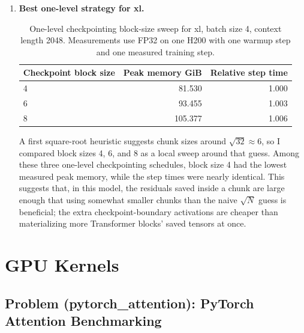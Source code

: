 \documentclass[11pt]{article}
\begin{document}
\begin{enumerate}
  \item \textbf{Best one-level strategy for xl.}
  \begin{table}[H]
    \centering
    \caption{One-level checkpointing block-size sweep for xl, batch size 4, context length 2048. Measurements use FP32 on one H200 with one warmup step and one measured training step.}
    \begin{tabular}{lrr}
      \toprule
      Checkpoint block size & Peak memory GiB & Relative step time \\
      \midrule
      4 & 81.530 & 1.000 \\
      6 & 93.455 & 1.003 \\
      8 & 105.377 & 1.006 \\
      \bottomrule
    \end{tabular}
  \end{table}
  A first square-root heuristic suggests chunk sizes around $\sqrt{32}\approx 6$, so I compared block sizes 4, 6, and 8 as a local sweep around that guess. Among these three one-level checkpointing schedules, block size 4 had the lowest measured peak memory, while the step times were nearly identical. This suggests that, in this model, the residuals saved inside a chunk are large enough that using somewhat smaller chunks than the naive $\sqrt{N}$ guess is beneficial; the extra checkpoint-boundary activations are cheaper than materializing more Transformer blocks' saved tensors at once.
\end{enumerate}

\section{GPU Kernels}

\subsection{Problem (pytorch\_attention): PyTorch Attention Benchmarking}
\end{document}
